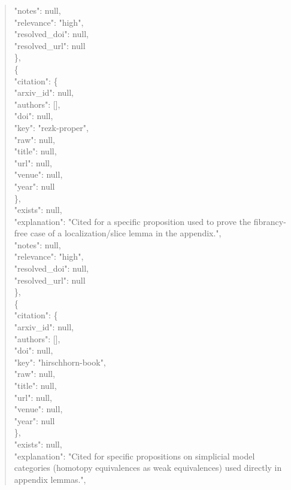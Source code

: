 \documentclass[11pt]{article}
\begin{document}
\begin{quote}
      "notes": null,\\
      "relevance": "high",\\
      "resolved\_doi": null,\\
      "resolved\_url": null\\
    \},\\
    \{\\
      "citation": \{\\
        "arxiv\_id": null,\\
        "authors": [],\\
        "doi": null,\\
        "key": "rezk-proper",\\
        "raw": null,\\
        "title": null,\\
        "url": null,\\
        "venue": null,\\
        "year": null\\
      \},\\
      "exists": null,\\
      "explanation": "Cited for a specific proposition used to prove the fibrancy-free case of a localization/slice lemma in the appendix.",\\
      "notes": null,\\
      "relevance": "high",\\
      "resolved\_doi": null,\\
      "resolved\_url": null\\
    \},\\
    \{\\
      "citation": \{\\
        "arxiv\_id": null,\\
        "authors": [],\\
        "doi": null,\\
        "key": "hirschhorn-book",\\
        "raw": null,\\
        "title": null,\\
        "url": null,\\
        "venue": null,\\
        "year": null\\
      \},\\
      "exists": null,\\
      "explanation": "Cited for specific propositions on simplicial model categories (homotopy equivalences as weak equivalences) used directly in appendix lemmas.",\\

\end{quote}
\end{document}
